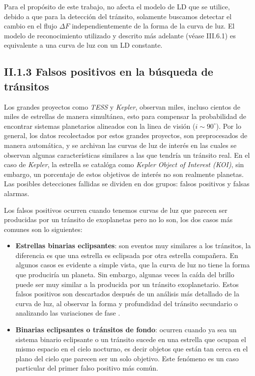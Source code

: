 Para el propósito de este trabajo, no afecta el modelo de LD que se utilice, debido a que para la detección del tránsito, solamente buscamos detectar el cambio en el flujo $\Delta F$ independientemente de la forma de la curva de luz. El modelo de reconocimiento utilizado y descrito más adelante (véase III.6.1) es equivalente a una curva de luz con un LD constante.

\subsection*{II.1.3 Falsos positivos en la búsqueda de tránsitos}

Los grandes proyectos como \textit{TESS} y \textit{Kepler}, observan miles, incluso cientos de miles de estrellas de manera simultánea, esto para compensar la probabilidad de encontrar sistemas planetarios alineados con la linea de visión ($i\sim 90^{\circ}$). Por lo general, los datos recolectados por estos grandes proyectos, son preprocesados de manera automática, y se archivan las curvas de luz de interés en las cuales se observan algunas características similares a las que tendría un tránsito real. En el caso de \textit{Kepler}, la estrella se catalóga como \textit{Kepler Object of Interest (KOI)}, sin embargo, un porcentaje de estos objetivos de interés no son realmente planetas. Las posibles detecciones fallidas se dividen en dos grupos: falsos positivos y falsas alarmas.

Los falsos positivos ocurren cuando tenemos curvas de luz que parecen ser producidas por un tránsito de exoplanetas pero no lo son, los dos casos más comunes son lo siguientes:

\begin{itemize}
\item \textbf{Estrellas binarias eclipsantes}: son eventos muy similares a los tránsitos, la diferencia es que una estrella es eclipsada por otra estrella compañera. En algunos casos es evidente a simple vista, que la curva de luz no tiene la forma que produciría un planeta. Sin embargo, algunas veces la caída del brillo puede ser muy similar a la producida por un tránsito exoplanetario. Estos falsos positivos son descartados después de un análisis más detallado de la curva de luz, al observar la forma y profundidad del tránsito secundario o analizando las variaciones de fase \cite{bryson2017kepler}.
\item \textbf{Binarias eclipsantes o tránsitos de fondo}: ocurren cuando ya sea un sistema binario eclipsante o un tránsito sucede en una estrella que ocupan el mismo espacio en el cielo nocturno, es decir objetos que están tan cerca en el plano del cielo que parecen ser un solo objetivo. Este fenómeno es un caso particular del primer falso positivo más común.
\end{itemize}

